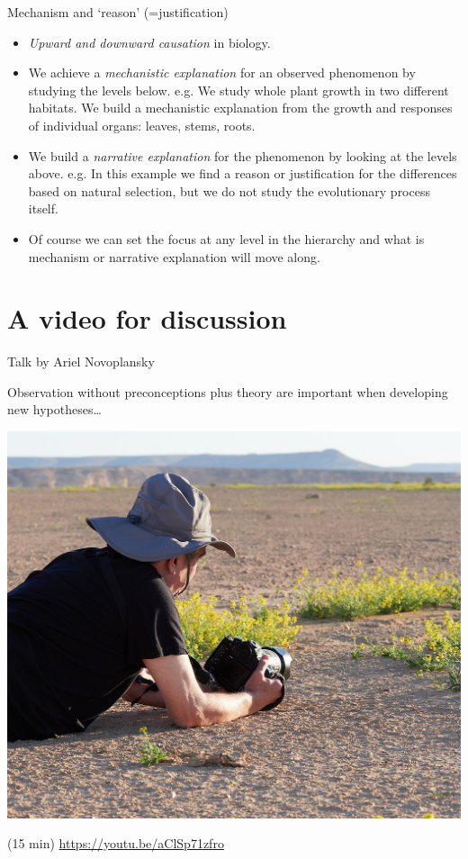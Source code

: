 \documentclass[10pt]{beamer}
\begin{document}
\begin{frame}{Mechanism and `reason' (=justification)}
    \begin{itemize}
        \item \emph{Upward and downward causation} in biology.
        \item We achieve a \emph{mechanistic explanation} for an
        observed phenomenon by studying the levels below.
        e.g. We study whole plant growth in two different habitats.
        We build a mechanistic
        explanation from the growth and responses of individual
        organs: leaves, stems, roots.

        \item We build a \emph{narrative explanation} for the phenomenon
        by looking at the levels above.
        e.g. In this example we find a reason or justification for
        the differences based on natural selection, but we do not study
        the evolutionary process itself.

        \item Of course we can set the focus at any level in the hierarchy and what is mechanism or narrative explanation will move along.~\DExamples
    \end{itemize}
\end{frame}

\section{A video for discussion}
\nocite{Falik2011,Falik2012,Novoplansky2021}

\begin{frame}{Talk by Ariel Novoplansky \Video}

Observation without preconceptions plus theory are important when developing new hypotheses\ldots

\includegraphics[width=0.5\linewidth]{photos/ariel}

 \Video (15 min) \url{https://youtu.be/aClSp71zfro}

\end{frame}
\end{document}
